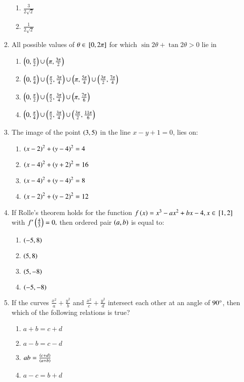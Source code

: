 \documentclass[journal]{IEEEtran}
\begin{document}
\begin{enumerate}
\begin{enumerate}
    \item $\frac{3}{2\sqrt{2}}$
    \item $\frac{1}{2\sqrt{2}}$
\end{enumerate}
\item All possible values of $\theta\in{}\left[0,2\pi\right]$ for which $\sin2\theta+\tan2\theta>0$ lie in
\begin{enumerate}
    \item $\left(0,\frac{\pi}{2}\right)\cup\left(\pi,\frac{3\pi}{2}\right)$
    \item $\left(0,\frac{\pi}{4}\right)\cup\left(\frac{\pi}{2},\frac{3\pi}{4}\right)\cup\left(\pi,\frac{5\pi}{4}\right)\cup\left(\frac{3\pi}{2},\frac{7\pi}{4}\right)$
    \item $\left(0,\frac{\pi}{2}\right)\cup\left(\frac{\pi}{2},\frac{3\pi}{4}\right)\cup\left(\pi,\frac{7\pi}{6}\right)$
    \item $\left(0,\frac{\pi}{4}\right)\cup\left(\frac{\pi}{2},\frac{3\pi}{4}\right)\cup\left(\frac{3\pi}{2},\frac{11\pi}{6}\right)$
\end{enumerate}
\item The image of the point $\left(3,5\right)$ in the line $x-y+1=0$, lies on$\colon$
\begin{enumerate}
    \item $\left(x-2\right)^{2}+\left(y-4\right)^{2}=4$
    \item $\left(x-4\right)^{2}+\left(y+2\right)^{2}=16$
    \item $\left(x-4\right)^{2}+\left(y-4\right)^{2}=8$
    \item $\left(x-2\right)^{2}+\left(y-2\right)^{2}=12$
\end{enumerate}
\item If Rolle's theorem holds for the function $f\left(x\right)=x^{3}-ax^{2}+bx-4, x \in {}\left[1,2\right]$ with $f^{\prime}\left(\frac{4}{3}\right)=0,$ then ordered pair $\left(a,b\right)$ is equal to$\colon$
\begin{enumerate}
    \item $\left(-5,8\right)$
    \item $\left(5,8\right)$
    \item $\left(5,-8\right)$
    \item $\left(-5,-8\right)$
\end{enumerate}
\item If the curves $\frac{x^{2}}{a}+\frac{y^{2}}{b}$ and $\frac{x^{2}}{c}+\frac{y^{2}}{d}$ intersect each other at an angle of $90\degree$, then which of the following relations is true?
\begin{enumerate}
    \item $a+b=c+d$
    \item $a-b=c-d$
    \item $ab=\frac{\left(c+d\right)}{\left(a+b\right)}$
    \item $a-c=b+d$
\end{enumerate}
\end{enumerate}
\end{document}
